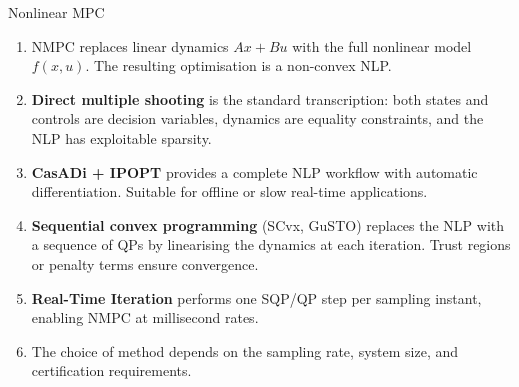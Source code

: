 \begin{summarybox}{Nonlinear MPC}
	\begin{enumerate}[nosep]
		\item NMPC replaces linear dynamics $Ax + Bu$ with the full nonlinear model $f(x, u)$. The resulting optimisation is a non-convex NLP.
		\item \textbf{Direct multiple shooting} is the standard transcription: both states and controls are decision variables, dynamics are equality constraints, and the NLP has exploitable sparsity.
		\item \textbf{CasADi + IPOPT} provides a complete NLP workflow with automatic differentiation. Suitable for offline or slow real-time applications.
		\item \textbf{Sequential convex programming} (SCvx, GuSTO) replaces the NLP with a sequence of QPs by linearising the dynamics at each iteration. Trust regions or penalty terms ensure convergence.
		\item \textbf{Real-Time Iteration} performs one SQP/QP step per sampling instant, enabling NMPC at millisecond rates.
		\item The choice of method depends on the sampling rate, system size, and certification requirements.
	\end{enumerate}
\end{summarybox}


